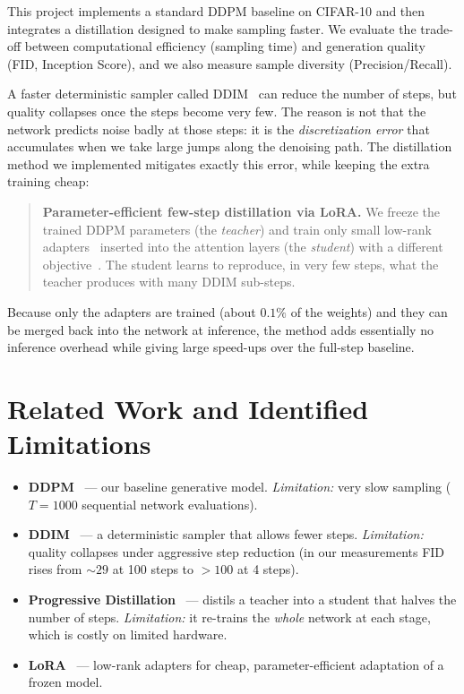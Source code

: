 \documentclass[11pt]{article}
\begin{document}
This project implements a standard DDPM baseline
on CIFAR-10 and then integrates a distillation designed to make sampling
faster. We evaluate the trade-off between computational efficiency (sampling time) and
generation quality (FID, Inception Score), and we also measure sample diversity
(Precision/Recall).

A faster deterministic sampler called DDIM~\cite{song2021ddim} can reduce the number of
steps, but quality collapses once the steps become very few. The reason is not that the
network predicts noise badly at those steps: it is the \emph{discretization error} that
accumulates when we take large jumps along the denoising path. The distillation method we implemented mitigates
exactly this error, while keeping the extra training cheap:

\begin{quote}
\textbf{Parameter-efficient few-step distillation via LoRA.} We freeze the trained DDPM parameters
(the \emph{teacher}) and train only small low-rank adapters~\cite{hu2021lora} inserted
into the attention layers (the \emph{student}) with a different
objective~\cite{salimans2022progressive}. The student learns to reproduce, in very few
steps, what the teacher produces with many DDIM sub-steps.
\end{quote}

Because only the adapters are trained (about $0.1\%$ of the weights) and they can be
merged back into the network at inference, the method adds essentially no inference
overhead while giving large speed-ups over the full-step baseline.

\section{Related Work and Identified Limitations}
\begin{itemize}
  \item \textbf{DDPM}~\cite{ho2020ddpm} --- our baseline generative model.
        \emph{Limitation:} very slow sampling ($T=1000$ sequential network evaluations).
  \item \textbf{DDIM}~\cite{song2021ddim} --- a deterministic sampler that allows fewer
        steps. \emph{Limitation:} quality collapses under aggressive step reduction (in
        our measurements FID rises from ${\sim}29$ at 100 steps to ${>}100$ at 4 steps).
  \item \textbf{Progressive Distillation}~\cite{salimans2022progressive} --- distils a
        teacher into a student that halves the number of steps. \emph{Limitation:} it
        re-trains the \emph{whole} network at each stage, which is costly on limited
        hardware.
  \item \textbf{LoRA}~\cite{hu2021lora} --- low-rank adapters for cheap, parameter-efficient
        adaptation of a frozen model.
\end{itemize}
\end{document}
